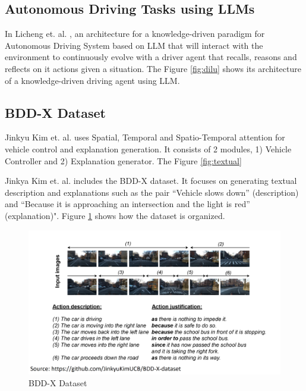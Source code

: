 \begin{spacing}{1.5}
\begin{sloppypar}



\subsection{Autonomous Driving Tasks using LLMs}

In Licheng et. al. \cite{wen2023dilu}, an architecture for a knowledge-driven paradigm for Autonomous Driving System based on LLM that will interact with the environment to continuously evolve with a driver agent that recalls, reasons and reflects on it actions given a situation. The Figure \ref{fig:dilu} shows its architecture of a knowledge-driven driving agent using LLM.

\subsection{BDD-X Dataset}
Jinkyu Kim et. al. \cite{textual} uses Spatial, Temporal and Spatio-Temporal attention for vehicle control and explanation generation. It consists of 2 modules, 1) Vehicle Controller and 2) Explanation generator. The Figure \ref{fig:textual}

Jinkya Kim et. al. \cite{textual} includes the BDD-X dataset. It focuses on generating textual description and explanations such as the pair “Vehicle slows down” (description) and “Because it is approaching an intersection and the light is red” (explanation)". Figure \ref{fig:textual2} shows how the dataset is organized.  

\begin{figure}[h]
\begin{center}
\includegraphics[scale=0.3]{2/textual_2.png}
\caption{BDD-X Dataset}
\label{fig:textual2}
\end{center}
\end{figure}


\end{sloppypar}
\end{spacing}
